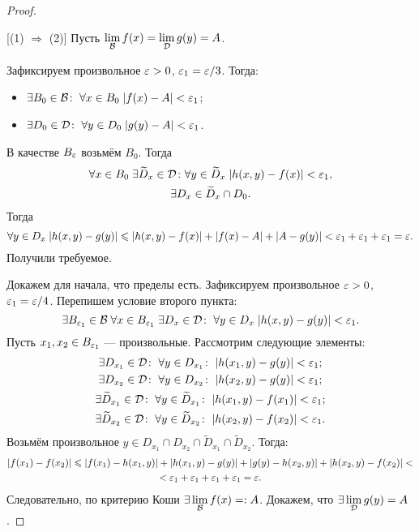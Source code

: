 \begin{proof}\ 

    [(1) $\Rightarrow$ (2)] Пусть $\lim\limits_{\mathcal{B}} f(x) = \lim\limits_{\mathcal{D}} g(y) = A$. 
    \par Зафиксируем произвольное $\varepsilon > 0$, $\varepsilon_1 = \varepsilon/3$. Тогда:
    \begin{itemize}
        \item $\exists B_0\in \mathcal{B}\colon\; \forall x\in B_0\; |f(x) - A| <\varepsilon_1$;
        \item $\exists D_0\in \mathcal{D}\colon\; \forall y\in D_0\; |g(y) - A| <\varepsilon_1$.
    \end{itemize}
    В качестве $B_\varepsilon$ возьмём $B_0$. Тогда
    \begin{gather*}
        \forall x\in B_0\; \exists \widetilde{D}_x \in \mathcal{D}\colon \forall y \in \widetilde{D}_x\; |h(x,y) -f(x)| < \varepsilon_1,\\
        \exists D_x \in \widetilde{D}_x\cap D_0.
    \end{gather*}
    Тогда $$
    \forall y\in D_x\; |h(x,y) - g(y)| \leqslant |h(x,y) - f(x)| + |f(x) - A| + |A- g(y)| < \varepsilon_1 + \varepsilon_1 + \varepsilon_1 = \varepsilon.
    $$
    Получили требуемое.
    \par [$(2) \Rightarrow (1)$] Докажем для начала, что пределы есть. Зафиксируем произвольное $\varepsilon > 0$, $\varepsilon_1 = \varepsilon/4$. Перепишем условие второго пункта:
    $$
        \exists B_{\varepsilon_1} \in \mathcal{B}\; \forall x\in B_{\varepsilon_1}\; \exists D_x \in \mathcal{D}\colon\;  \forall y \in D_x \; |h(x,y) - g(y)| < \varepsilon_1.
    $$
    Пусть $x_1, x_2 \in B_{\varepsilon_1}$ --- произвольные. Рассмотрим следующие элементы:
    \begin{gather*}
        \exists D_{x_1} \in \mathcal{D}\colon \; \forall y\in D_{x_1}\colon \; |h(x_1,y) - g(y)|<\varepsilon_1;\\
        \exists D_{x_2}\in \mathcal{D}\colon \; \forall y \in D_{x_2}\colon \; |h(x_2, y) - g(y)| < \varepsilon_1;\\
        \exists \widetilde{D}_{x_1}\in \mathcal{D}\colon \; \forall y\in \widetilde{D}_{x_1}\colon \; |h(x_1,y) - f(x_1)| < \varepsilon_1;\\
        \exists \widetilde{D}_{x_2} \in \mathcal{D}\colon \; \forall y\in \widetilde{D}_{x_2}\colon \; |h(x_2,y) - f(x_2)| < \varepsilon_1.\\
    \end{gather*}
    Возьмём произвольное $y\in D_{x_1} \cap D_{x_2} \cap \widetilde{D}_{x_1}\cap \widetilde{D}_{x_2}$. Тогда:
    \begin{gather}
        |f(x_1) - f(x_2)| \leqslant |f(x_1) - h(x_1, y)| + |h(x_1, y) - g(y)| + |g(y) - h(x_2, y)| + |h(x_2, y) - f(x_2)|<\\ < \varepsilon_1 + \varepsilon_1 + \varepsilon_1 + \varepsilon_1 = \varepsilon.
    \end{gather}
    Следовательно, по критерию Коши $\exists \lim\limits_{\mathcal{B}} f(x) =: A$. Докажем, что $\exists \lim \limits_{\mathcal{D}} g(y) = A$. 
    

\end{proof}
